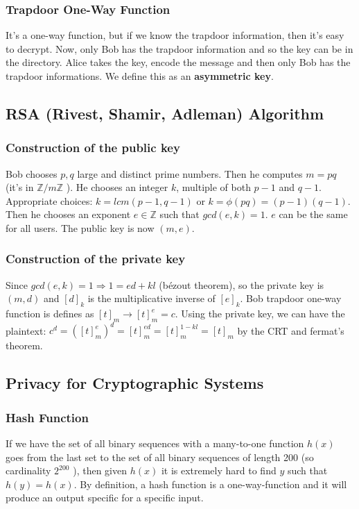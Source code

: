 \documentclass{article}
\begin{document}
\subsubsection{Trapdoor One-Way Function} It's a one-way function, but if we know the trapdoor information, then it's easy to decrypt. Now, only Bob has the trapdoor information and so the key can be in the directory. Alice takes the key, encode the message and then only Bob has the trapdoor informations. We define this as an \textbf{asymmetric key}.

\subsection{RSA (Rivest, Shamir, Adleman) Algorithm}
\subsubsection{Construction of the public key} Bob chooses $ p, q $ large and distinct prime numbers. Then he computes $ m = pq $ (it's in $ \mathbb{Z}/m\mathbb{Z} $ ). He chooses an integer $ k $, multiple of both $ p-1 $ and $ q-1 $. Appropriate choices: $ k = lcm(p-1,q-1) $ or $ k = \phi(pq) = (p-1)(q-1) $. Then he chooses an exponent $ e \in \mathbb{Z} $ such that $ gcd(e, k) = 1 $. $ e $ can be the same for all users. The public key is now $ (m, e) $.

\subsubsection{Construction of the private key} Since $ gcd(e, k) = 1 \Rightarrow 1 = ed + kl $ (bézout theorem), so the private key is $ (m, d) $ and $ [d]_k $ is the multiplicative inverse of $ [e]_k $. Bob trapdoor one-way function is defines as $ [t]_m \rightarrow [t]^{e}_m = c $. Using the private key, we can have the plaintext: $ c^d = ([t]^{e}_{m})^d = [t]^{ed}_{m} = [t]^{1-kl}_{m} = [t]_m $ by the CRT and fermat's theorem.

\subsection{Privacy for Cryptographic Systems}
\subsubsection{Hash Function} If we have the set of all binary sequences with a many-to-one function $ h(x) $ goes from the last set to the set of all binary sequences of length 200 (so cardinality $ 2^{200} $ ), then given $ h(x) $ it is extremely hard to find $ y $ such that $ h(y) = h(x) $. By definition, a hash function is a one-way-function and it will produce an output specific for a specific input. 
\end{document}
